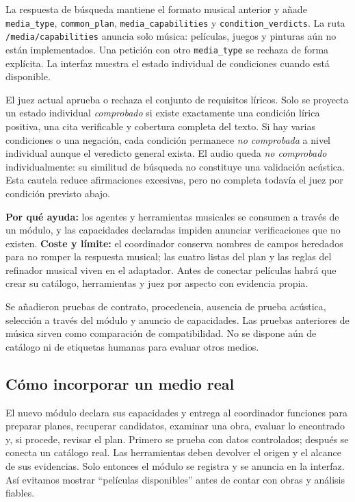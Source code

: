 \documentclass[11pt,a4paper]{article}
\begin{document}
La respuesta de búsqueda mantiene el formato musical anterior y añade \texttt{media\_type}, \texttt{common\_plan}, \texttt{media\_capabilities} y \texttt{condition\_verdicts}. La ruta \texttt{/media/capabilities} anuncia solo música: películas, juegos y pinturas aún no están implementados. Una petición con otro \texttt{media\_type} se rechaza de forma explícita. La interfaz muestra el estado individual de condiciones cuando está disponible.

El juez actual aprueba o rechaza el conjunto de requisitos líricos. Solo se proyecta un estado individual \emph{comprobado} si existe exactamente una condición lírica positiva, una cita verificable y cobertura completa del texto. Si hay varias condiciones o una negación, cada condición permanece \emph{no comprobada} a nivel individual aunque el veredicto general exista. El audio queda \emph{no comprobado} individualmente: su similitud de búsqueda no constituye una validación acústica. Esta cautela reduce afirmaciones excesivas, pero no completa todavía el juez por condición previsto abajo.

\textbf{Por qué ayuda:} los agentes y herramientas musicales se consumen a través de un módulo, y las capacidades declaradas impiden anunciar verificaciones que no existen. \textbf{Coste y límite:} el coordinador conserva nombres de campos heredados para no romper la respuesta musical; las cuatro listas del plan y las reglas del refinador musical viven en el adaptador. Antes de conectar películas habrá que crear su catálogo, herramientas y juez por aspecto con evidencia propia.

Se añadieron pruebas de contrato, procedencia, ausencia de prueba acústica, selección a través del módulo y anuncio de capacidades. Las pruebas anteriores de música sirven como comparación de compatibilidad. No se dispone aún de catálogo ni de etiquetas humanas para evaluar otros medios.

\subsection{Cómo incorporar un medio real}
El nuevo módulo declara sus capacidades y entrega al coordinador funciones para preparar planes, recuperar candidatos, examinar una obra, evaluar lo encontrado y, si procede, revisar el plan. Primero se prueba con datos controlados; después se conecta un catálogo real. Las herramientas deben devolver el origen y el alcance de sus evidencias. Solo entonces el módulo se registra y se anuncia en la interfaz. Así evitamos mostrar ``películas disponibles'' antes de contar con obras y análisis fiables.
\end{document}
